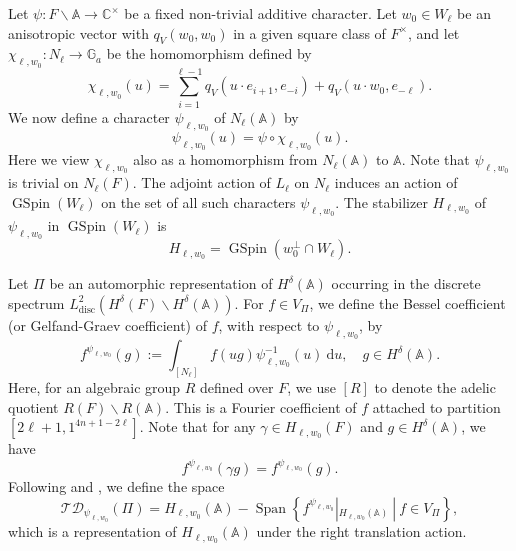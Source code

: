\documentclass[12pt]{amsart}
\newcommand{\A}{\mathbb{A}}
\newcommand{\C}{\mathbb{C}}
\newcommand{\Span}{\operatorname{Span}}
\newcommand{\TD}{\mathcal{TD}}
\theoremstyle{remark}
\DeclareMathOperator{\GSpin}{GSpin}
\newcommand{\bs}{\backslash}
\begin{document}
Let $\psi:F\backslash \A\to \C^\times$ be a fixed non-trivial additive character. Let $w_0\in W_\ell$ be an anisotropic vector  with $q_V(w_0,w_0)$ in a given square class of $F^\times$, and let $\chi_{\ell,w_0}:N_{\ell}\to \mathbb{G}_a$ be the homomorphism defined by
\begin{equation}\label{eq-chi-ell-w_0-global}
\chi_{\ell,w_0}(u)=	\sum_{i=1}^{\ell-1}q_V(u\cdot e_{i+1}, e_{-i})+q_V(u\cdot w_0, e_{-\ell}).
\end{equation}
We now define a character  $\psi_{\ell, w_0}$ of $N_{\ell}(\A)$ by
\begin{equation}\label{eq-psi-ell-w_0-global}
\psi_{\ell, w_0}(u)=\psi\circ \chi_{\ell, w_0}(u).	
\end{equation}
Here we view $\chi_{\ell,w_0}$ also as a homomorphism from $N_{\ell}(\A)$ to $\A$. 
Note that $\psi_{\ell, w_0}$ is trivial on $N_{\ell}(F)$. The adjoint action of $L_{\ell}$ on $N_{\ell}$ induces an action of $\GSpin(W_{\ell})$ on the set of all such characters $\psi_{\ell, w_0}$. The stabilizer $H_{\ell,w_0}$ of $\psi_{\ell,w_0}$ in $\GSpin(W_{\ell})$ is 
\begin{equation*}
	H_{\ell,w_0}=\GSpin(w_0^\perp \cap W_{\ell}).
\end{equation*}


Let $\Pi$ be an automorphic representation of $H^\delta(\A)$ occurring in the discrete spectrum $L^2_{\text{disc}}(H^{\delta}(F)\backslash H^{\delta}(\A))$. 
For $f\in V_\Pi$, we define the Bessel coefficient (or Gelfand-Graev coefficient) of $f$, with respect to $ \psi_{\ell,w_0}$, 
by
\begin{equation}
\label{eq-Bessel-coef}
 f^{\psi_{\ell, w_0}}(g):=\int_{[N_\ell]} f(ug)\psi_{\ell,w_0}^{-1}(u)\ \mathrm{d}u, \quad g\in H^\delta(\A).
\end{equation}
Here, for an algebraic group $R$ defined over $F$, we use $[R]$ to denote the adelic quotient $R(F)\bs R(\A)$. 
This is a Fourier coefficient of $f$ attached to partition $[2\ell+1, 1^{4n+1-2\ell}]$. 
Note that for any $\gamma\in H_{\ell,w_0}(F)$ and $g\in H^\delta(\A)$, we have
\begin{equation*}
	 f^{\psi_{\ell, w_0}}(\gamma g)= f^{\psi_{\ell, w_0}}(g).
\end{equation*}
Following \cite[\S 3.1]{GinzburgRallisSoudry2011} and \cite[\S 1.2]{JiangLiuXuZhang2016}, we define the space 
$$
\TD_{\psi_{\ell,w_0}}(\Pi)=H_{\ell,w_0}(\A)-\Span \left\{f^{\psi_{\ell, w_0}}|_{H_{\ell,w_0}(\A)}\ | \ f\in V_\Pi\right\},
$$
which is a representation of $H_{\ell,w_0}(\A)$ under the right translation action. 
\end{document}
